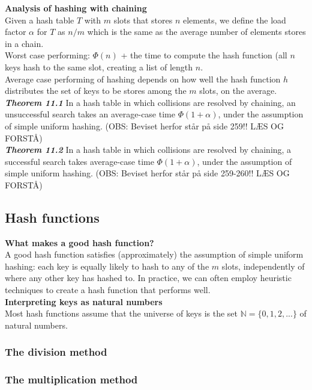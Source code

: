 \documentclass[12pt]{article}
\begin{document}
\textbf{Analysis of hashing with chaining}\\
Given a hash table $T$ with $m$ slots that stores $n$ elements, we define the load factor $\alpha$ for $T$ as $n/m$ which is the same as the average number of elements stores in a chain. \\

Worst case performing: $\Phi (n)$ + the time to compute the hash function (all $n$ keys hash to the same slot, creating a list of length $n$. \\

Average case performing of hashing depends on how well the hash function $h$ distributes the set of keys to be stores among the $m$ slots, on the average. \\

\textbf{\textit{Theorem 11.1}}
In a hash table in which collisions are resolved by chaining, an unsuccessful search takes an average-case time $\Phi (1 + \alpha)$, under the assumption of simple uniform hashing. (OBS: Beviset herfor står på side 259!! LÆS OG FORSTÅ)\\

\textbf{\textit{Theorem 11.2}} 
In a hash table in which collisions are resolved by chaining, a successful search takes average-case time $\Phi (1 + \alpha)$, under the assumption of simple uniform hashing. (OBS: Beviset herfor står på side 259-260!! LÆS OG FORSTÅ)

\subsection{Hash functions}
\textbf{What makes a good hash function?} \\
A good hash function satisfies (approximately) the assumption of simple uniform hashing: each key is equally likely to hash to any of the $m$ slots, independently of where any other key has hashed to. In practice, we can often employ heuristic techniques to create a hash function that performs well. \\

\textbf{Interpreting keys as natural numbers}\\
Most hash functions assume that the universe of keys is the set $\mathbb{N} = \{0, 1, 2, ...\}$ of natural numbers. 

\subsubsection{The division method}
\subsubsection{The multiplication method}
\end{document}
